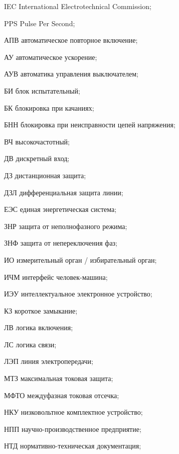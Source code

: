 \begin{list}{}%
{%
  \setlength{\labelwidth}{\abbrwidth}%
  \setlength{\labelsep}{0pt}%
  \setlength{\leftmargin}{\dimexpr\labelwidth+\labelsep\relax}%
  \setlength{\itemindent}{0pt}%
  \setlength{\parsep}{0pt}%
  \setlength{\itemsep}{0pt}
  \renewcommand{\makelabel}[1]{#1 --\hspace{\abbrgap}}%
}
\item[IEC]  International Electrotechnical Commission;
\item[PPS] Pulse Per Second;
\item[АПВ] автоматическое повторное включение;
\item[АУ] автоматическое ускорение;
\item[АУВ] автоматика управления выключателем;
\item[БИ] блок испытательный;
\item[БК] блокировка при качаниях;
\item[БНН] блокировка при неисправности цепей напряжения;
\item[ВЧ] высокочастотный;
\item[ДВ] дискретный вход;
\item[ДЗ] дистанционная защита;
\item[ДЗЛ] дифференциальная защита линии;
\item[ЕЭС] единая энергетическая система;
\item[ЗНР] защита от неполнофазного режима;
\item[ЗНФ] защита от непереключения фаз;
\item[ИО] измерительный орган / избирательный орган;
\item[ИЧМ] интерфейс человек-машина;
\item[ИЭУ] интеллектуальное электронное устройство;
\item[КЗ] короткое замыкание;
\item[ЛВ] логика включения;
\item[ЛС] логика связи;
\item[ЛЭП] линия электропередачи;
\item[МТЗ] максимальная токовая защита;
\item[МФТО] междуфазная токовая отсечка;
\item[НКУ] низковольтное комплектное устройство;
\item[НПП] научно-производственное предприятие;
\item[НТД] нормативно-техническая документация;

\end{list}
